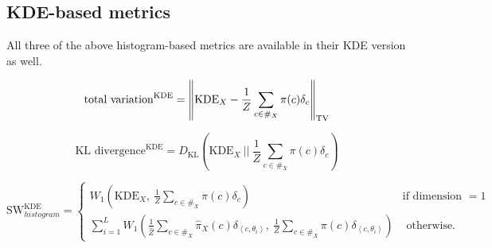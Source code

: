 \subsection{KDE-based metrics}

All three of the above histogram-based metrics are available in their KDE version as well. 

\[\text{total variation}^{\text{KDE}} = \norm{\text{KDE}_X - \frac 1 Z \sum_{c \in \#_X} \pi(c) \delta_c}_{\text{TV}} \]

\[\text{KL divergence}^{\text{KDE}} = D_{\text{KL}} \left(\text{KDE}_X \ \bigg|\bigg|\  \frac 1 Z \sum_{c \in \#_X} \pi(c) \delta_c\right) \]

\[\text{SW}_{histogram}^{\text{KDE}} = \begin{cases}
W_1 \left( \text{KDE}_X,\  \frac 1 Z \sum_{c \in \#_X} \pi(c) \delta_c \right) & \text{if dimension } = 1 \\
\sum_{i = 1}^L W_1 \left( \frac 1 {\hat Z} \sum_{c \in \#_X} \hat{\pi}_X(c) \delta_{\left<c, \theta_i \right>},\  \frac 1 Z \sum_{c \in \#_X} \pi(c) \delta_{\left<c, \theta_i \right>}  \right) & \text{ otherwise. }
\end{cases}\]